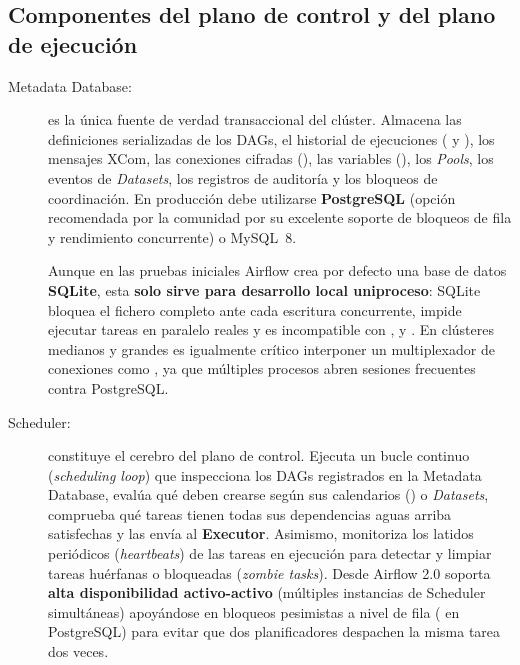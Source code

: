 \subsection{Componentes del plano de control y del plano de ejecución}\label{subsec:componentes-airflow-2}

\begin{description}
  \item[Metadata Database:] es la única fuente de verdad transaccional del clúster. Almacena las definiciones serializadas de los DAGs, el historial de ejecuciones ( y ), los mensajes XCom, las conexiones cifradas (), las variables (), los \textit{Pools}, los eventos de \textit{Datasets}, los registros de auditoría y los bloqueos de coordinación. En producción debe utilizarse \textbf{PostgreSQL} (opción recomendada por la comunidad por su excelente soporte de bloqueos de fila y rendimiento concurrente) o MySQL~8.

  Aunque en las pruebas iniciales Airflow crea por defecto una base de datos \textbf{SQLite}, esta \textbf{solo sirve para desarrollo local uniproceso}: SQLite bloquea el fichero completo ante cada escritura concurrente, impide ejecutar tareas en paralelo reales y es incompatible con ,  y . En clústeres medianos y grandes es igualmente crítico interponer un multiplexador de conexiones como , ya que múltiples procesos abren sesiones frecuentes contra PostgreSQL.

  \item[Scheduler:] constituye el cerebro del plano de control. Ejecuta un bucle continuo (\textit{scheduling loop}) que inspecciona los DAGs registrados en la Metadata Database, evalúa qué  deben crearse según sus calendarios () o \textit{Datasets}, comprueba qué tareas tienen todas sus dependencias aguas arriba satisfechas y las envía al \textbf{Executor}. Asimismo, monitoriza los latidos periódicos (\textit{heartbeats}) de las tareas en ejecución para detectar y limpiar tareas huérfanas o bloqueadas (\textit{zombie tasks}). Desde Airflow 2.0 soporta \textbf{alta disponibilidad activo-activo} (múltiples instancias de Scheduler simultáneas) apoyándose en bloqueos pesimistas a nivel de fila ( en PostgreSQL) para evitar que dos planificadores despachen la misma tarea dos veces.


\end{description}

